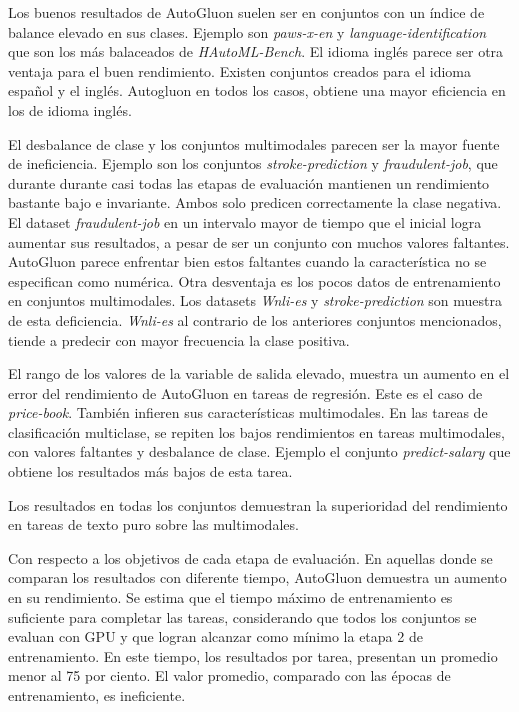 Los buenos resultados de AutoGluon suelen ser en conjuntos con un índice de balance elevado en sus clases. Ejemplo son \textit{paws-x-en} y 
\textit{language-identification} que son los más balaceados de \textit{HAutoML-Bench}. El idioma inglés parece ser otra ventaja para el buen rendimiento.
Existen conjuntos creados para el idioma español y el inglés. Autogluon en todos los casos, obtiene una mayor eficiencia en los de idioma inglés.

El desbalance de clase y los conjuntos multimodales parecen ser la mayor fuente de ineficiencia. Ejemplo son los conjuntos \textit{stroke-prediction} y 
\textit{fraudulent-job}, que durante durante casi todas las etapas de evaluación mantienen un rendimiento bastante bajo e invariante. Ambos solo predicen 
correctamente la clase negativa. El dataset \textit{fraudulent-job} en un intervalo mayor de tiempo que el inicial logra aumentar sus resultados, a pesar de ser un 
conjunto con muchos valores faltantes. AutoGluon parece enfrentar bien estos faltantes cuando la característica no se especifican como numérica. Otra desventaja es los 
pocos datos de entrenamiento en conjuntos multimodales. Los datasets \textit{Wnli-es} y \textit{stroke-prediction} son muestra de esta deficiencia. \textit{Wnli-es} al 
contrario de los anteriores conjuntos mencionados, tiende a predecir con mayor frecuencia la clase positiva.

El rango de los valores de la variable de salida elevado, muestra un aumento en el error del rendimiento de AutoGluon en tareas de regresión. 
Este es el caso de \textit{price-book}. También infieren sus características multimodales. En las tareas de clasificación multiclase, se repiten los bajos rendimientos
en tareas multimodales, con valores faltantes y desbalance de clase. Ejemplo el conjunto \textit{predict-salary} que obtiene los resultados más bajos de esta tarea. 

Los resultados en todas los conjuntos demuestran la superioridad del rendimiento en tareas de texto puro sobre las multimodales. 

Con respecto a los objetivos de cada etapa de evaluación. En aquellas donde se comparan los resultados con diferente tiempo, AutoGluon demuestra un aumento en 
su rendimiento. Se estima que el tiempo máximo de entrenamiento es suficiente para completar las tareas, considerando que todos los conjuntos se evaluan con GPU y que 
logran alcanzar como mínimo la etapa 2 de entrenamiento. En este tiempo, los resultados por tarea, presentan un promedio menor al 75 por ciento. El valor promedio, 
comparado con las épocas de entrenamiento, es ineficiente. 

